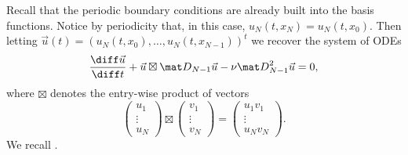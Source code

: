 Recall that the periodic boundary conditions are already built into the basis functions.
Notice by periodicity that, in this case, $u_N(t, x_N) = u_N(t, x_0)$.
Then letting $\vec u(t) = (u_N(t,x_0), \dots, u_N(t,x_{N-1}))^t$ we recover the system of ODEs
\begin{equation*}
    \frac{\diff \vec u}{\diff t} + \vec u \boxtimes  {\mat D}_{N-1} \vec u - \nu  {\mat D}^2_{N-1} \vec u = 0,
\end{equation*}
where $\boxtimes$ denotes the entry-wise product of vectors
\begin{equation*}
    \begin{pmatrix}
        u_1 \\ \vdots \\ u_N
    \end{pmatrix}
    \boxtimes
    \begin{pmatrix}
        v_1 \\ \vdots \\ v_N
    \end{pmatrix}
    =
    \begin{pmatrix}
        u_1v_1 \\ \vdots \\ u_Nv_N
    \end{pmatrix}.
\end{equation*}
We recall .


